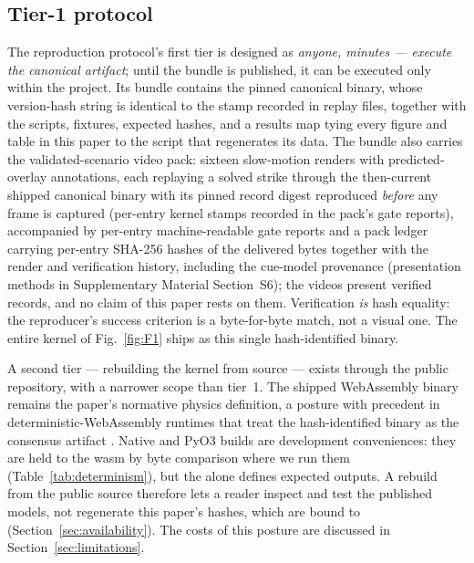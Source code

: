 \subsection{Tier-1 protocol}

The reproduction protocol's first tier is designed as \emph{anyone,
minutes --- execute the canonical artifact}; until the bundle is
published, it can be executed only within the project. Its bundle
contains the pinned canonical  binary, whose
version-hash string is identical to the stamp recorded in replay
files, together with the scripts, fixtures, expected hashes, and a
results map tying every figure and table in this paper to the script
that regenerates its data. The bundle also carries the
validated-scenario video pack: sixteen slow-motion renders with
predicted-overlay annotations, each replaying a solved strike
through the then-current shipped canonical binary with its pinned
record digest reproduced \emph{before} any frame is captured
(per-entry kernel stamps recorded in the pack's gate reports),
accompanied by per-entry machine-readable gate reports and a pack
ledger carrying per-entry SHA-256 hashes of the delivered bytes
together with the render and verification history, including the
cue-model provenance
(presentation methods in Supplementary Material Section~S6); the
videos present verified records, and no claim of this paper rests on
them. Verification \emph{is} hash equality: the
reproducer's success criterion is a byte-for-byte match, not a visual
one. The entire kernel of Fig.~\ref{fig:F1} ships as this single
hash-identified binary.

A second tier --- rebuilding the kernel from source --- exists through
the public repository, with a narrower scope than tier~1. The shipped
WebAssembly binary remains the paper's normative physics definition, a
posture with precedent in deterministic-WebAssembly runtimes that treat
the hash-identified binary as the consensus artifact
\citep{wasm2015nondeterminism}. Native and PyO3 builds are development
conveniences: they are held to the wasm by byte comparison where we run
them (Table~\ref{tab:determinism}), but the  alone defines
expected outputs. A rebuild from the public source therefore lets a
reader inspect and test the published models, not regenerate this
paper's hashes, which are bound to 
(Section~\ref{sec:availability}). The costs of this posture are discussed
in Section~\ref{sec:limitations}.


